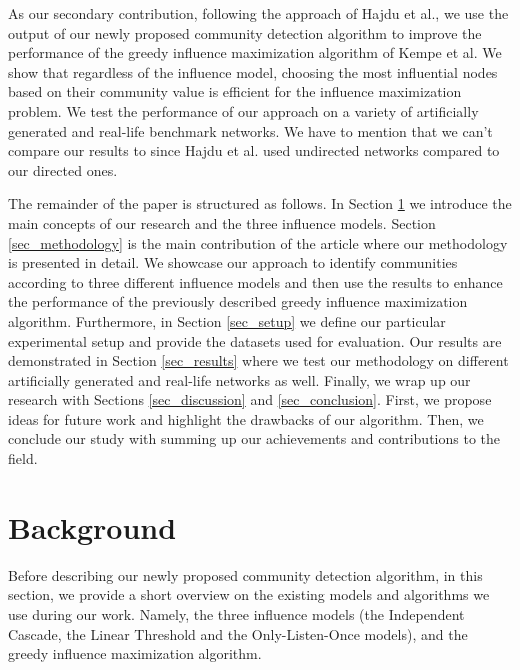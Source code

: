 \documentclass[pdflatex,sn-mathphys-ay]{sn-jnl}
\begin{document}
As our secondary contribution, following the approach of Hajdu et al., we use the output of our newly proposed community detection algorithm to improve the performance of the greedy influence maximization algorithm of Kempe et al. We show that regardless of the influence model, choosing the most influential nodes based on their community value is efficient for the influence maximization problem. We test the performance of our approach on a variety of artificially generated and real-life benchmark networks. We have to mention that we can't compare our results to \citep{evaluating} since Hajdu et al. used undirected networks compared to our directed ones.

The remainder of the paper is structured as follows. In Section \ref{sec_background} we introduce the main concepts of our research and the three influence models. Section \ref{sec_methodology} is the main contribution of the article where our methodology is presented in detail. We showcase our approach to identify communities according to three different influence models and then use the results to enhance the performance of the previously described greedy influence maximization algorithm. Furthermore, in Section \ref{sec_setup} we define our particular experimental setup and provide the datasets used for evaluation. Our results are demonstrated in Section \ref{sec_results} where we test our methodology on different artificially generated and real-life networks as well. Finally, we wrap up our research with Sections \ref{sec_discussion} and \ref{sec_conclusion}. First, we propose ideas for future work and highlight the drawbacks of our algorithm. Then, we conclude our study with summing up our achievements and contributions to the field.


\section{Background}\label{sec_background}

Before describing our newly proposed community detection algorithm, in this section, we provide a short overview on the existing models and algorithms we use during our work. Namely, the three influence models (the Independent Cascade, the Linear Threshold and the Only-Listen-Once models), and the greedy influence maximization algorithm.


\end{document}
